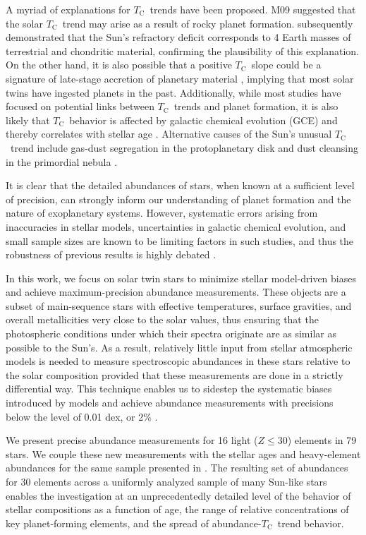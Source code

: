 \documentclass[twocolumn]{aastex62}
\newcommand{\tc}{$T_\mathrm{C}$}
\begin{document}
A myriad of explanations for \tc\ trends have been proposed. M09 suggested that the solar \tc\ trend may arise as a result of rocky planet formation. \citet{chambers10} subsequently demonstrated that the Sun's refractory deficit corresponds to 4 Earth masses of terrestrial and chondritic material, confirming the plausibility of this explanation. On the other hand, it is also possible that a positive \tc\ slope could be a signature of late-stage accretion of planetary material \citep[e.g.][]{ramirez11, spina15, oh17}, implying that most solar twins have ingested planets in the past. Additionally, while most studies have focused on potential links between \tc\ trends and planet formation, it is also likely that \tc\ behavior is affected by galactic chemical evolution (GCE) and thereby correlates with stellar age \citep{adibekyan14, nissen15, spina16b}. Alternative causes of the Sun's unusual \tc\ trend include gas-dust segregation in the protoplanetary disk and dust cleansing in the primordial nebula \citep{onehag14, gaidos15}.

It is clear that the detailed abundances of stars, when known at a sufficient level of precision, can strongly inform our understanding of planet formation and the nature of exoplanetary systems. 
However, systematic errors arising from inaccuracies in stellar models, uncertainties in galactic chemical evolution, and small sample sizes are known to be limiting factors in such studies, and thus the robustness of previous results is highly debated \citep{asplund09, fortney12, hinkel16, adibekyan14, nissen15}.

In this work, we focus on solar twin stars to minimize stellar model-driven biases and achieve maximum-precision abundance measurements. These objects are a subset of main-sequence stars with effective temperatures, surface gravities, and overall metallicities very close to the solar values, thus ensuring that the photospheric conditions under which their spectra originate are as similar as possible to the Sun's. As a result, relatively little input from stellar atmospheric models is needed to measure spectroscopic abundances in these stars relative to the solar composition provided that these measurements are done in a strictly differential way. This technique enables us to sidestep the systematic biases introduced by models and achieve abundance measurements with precisions below the level of 0.01 dex, or 2\% \citep{bedell14}.

We present precise abundance measurements for 16 light ($Z \leq 30$) elements in 79 stars. We couple these new measurements with the stellar ages and heavy-element abundances for the same sample presented in \citet{spina17}. The resulting set of abundances for 30 elements across a uniformly analyzed sample of many Sun-like stars enables the investigation at an unprecedentedly detailed level of the behavior of stellar compositions as a function of age, the range of relative concentrations of key planet-forming elements, and the spread of abundance-\tc\ trend behavior.
\end{document}
